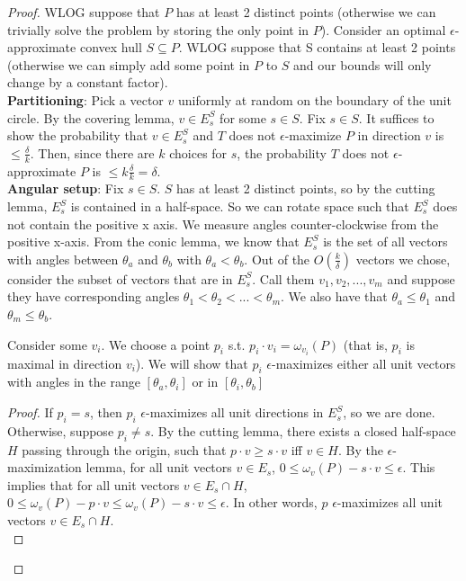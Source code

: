 \begin{proof}
WLOG suppose that $P$ has at least 2 distinct points (otherwise we can trivially solve the problem by storing the only point in $P$). Consider an optimal $\epsilon$-approximate convex hull $S \subseteq P$. WLOG suppose that S contains at least 2 points (otherwise we can simply add some point in $P$ to $S$ and our bounds will only change by a constant factor). 
\\

\textbf{Partitioning}: Pick a vector $v$ uniformly at random on the boundary of the unit circle. By the covering lemma, $v \in E^S_s$ for some $s \in S$. Fix $s \in S$. It suffices to show the probability that $v \in E^S_s$ and $T$ does not $\epsilon$-maximize $P$ in direction $v$ is $\leq \frac{\delta}{k}$. Then, since there are $k$ choices for $s$, the probability $T$ does not $\epsilon$-approximate $P$ is $\leq k\frac{\delta}{k} = \delta$.
\\

\textbf{Angular setup}: Fix $s \in S$. $S$ has at least 2 distinct points, so by the cutting lemma, $E^S_s$ is contained in a half-space. So we can rotate space such that $E^S_s$ does not contain the positive x axis. We measure angles counter-clockwise from the positive x-axis. From the conic lemma, we know that $E^S_s$ is the set of all vectors with angles between $\theta_a$ and $\theta_b$ with $\theta_a < \theta_b$. Out of the $O(\frac{k}{\delta})$ vectors we chose, consider the subset of vectors that are in $E^S_s$. Call them $v_1, v_2, ..., v_m$ and suppose they have corresponding angles $\theta_1 < \theta_2 < ... < \theta_m$. We also have that $\theta_a \leq \theta_1$ and $\theta_m \leq \theta_b$.
\\

\begin{lemma}
Consider some $v_i$. We choose a point $p_i$ s.t. $p_i \cdot v_i = \omega_{v_i}(P)$ (that is, $p_i$ is maximal in direction $v_i$). We will show that $p_i$ $\epsilon$-maximizes either all unit vectors with angles in the range $[\theta_a, \theta_i]$ or in $[\theta_i, \theta_b]$
\end{lemma}

\begin{proof}
If $p_i = s$, then $p_i$ $\epsilon$-maximizes all unit directions in $E^S_s$, so we are done. Otherwise, suppose $p_i \neq s$. By the cutting lemma, there exists a closed half-space $H$ passing through the origin, such that $p \cdot v \geq s \cdot v$ iff $v \in H$. By the $\epsilon$-maximization lemma, for all unit vectors $v \in E_s$, $0 \leq \omega_v(P) - s \cdot v \leq \epsilon$. This implies that for all unit vectors $v \in E_s \cap H$, $0 \leq \omega_v(P) - p \cdot v \leq \omega_v(P) - s \cdot v \leq \epsilon$. In other words, $p$ $\epsilon$-maximizes all unit vectors $v \in E_s \cap H$.
\\


\end{proof}
\end{proof}

